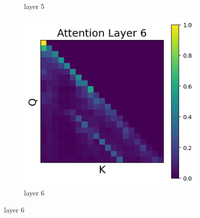 \documentclass[11pt]{article}
\begin{document}
\begin{figure}[t]
\begin{subfigure}[t]{0.24\textwidth}
    \caption{layer 5}
  \end{subfigure}\hfill
  \begin{subfigure}[t]{0.24\textwidth}
    \centering
    \includegraphics[width=1.4\columnwidth]{figures/intervention2/layer_6.png}
    \caption{layer 6}
  \end{subfigure}\hfill


\end{figure}
\end{document}
